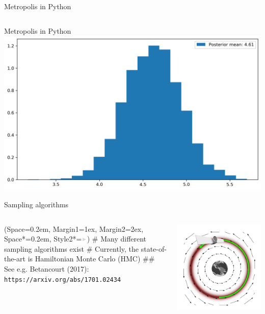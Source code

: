 \documentclass[12pt, aspectratio=149]{beamer}
\newcommand{\listSpace}{0.2em}
\theoremstyle{plain}
\begin{document}
\begin{frame}[fragile]{Metropolis in Python}
	\inputminted[fontsize=\tiny]{python}{../code/metropolis.py}
\end{frame}

\begin{frame}[fragile]{Metropolis in Python}
	\center
	\includegraphics[width=.7\textwidth]{figs/metropolis.png}
\end{frame}

\begin{frame}[fragile]{Sampling algorithms}
	\begin{columns}
		\begin{column}{0.5\linewidth}
			\begin{easylist}[itemize]
				\ListProperties(Space=\listSpace, Margin1=1ex, Margin2=2ex, Space*=\listSpace, Style2*=$\color{bggraydark}\blacktriangleright$\space)
				# Many different sampling algorithms exist
				# Currently, the state-of-the-art is Hamiltonian Monte Carlo (HMC)
				## See e.g. Betancourt (2017): \footnotesize\texttt{https://arxiv.org/abs/1701.02434}
			\end{easylist}
		\end{column}
		\begin{column}{0.5\textwidth}
			\includegraphics[width=\textwidth]{figs/hmc.png}
		\end{column}
	\end{columns}
\end{frame}
\end{document}
